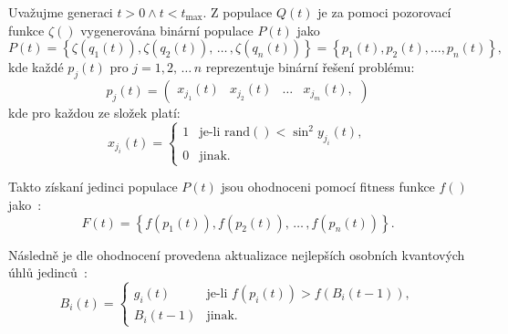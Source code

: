 Uvažujme generaci $t>0 \wedge t<t_{\text{max}}$. Z populace $Q\left(t\right)$ je za pomoci pozorovací funkce $\zeta\left(\right)$ vygenerována binární populace $P\left(t\right)$ jako
\begin{equation}
    P\left(t\right) = \left\{\zeta\left(q_1\left(t\right)\right), \zeta\left(q_2\left(t\right)\right), \,\dots\, , \zeta\left(q_n\left(t\right)\right) \right\} = \left\{ p_1\left(t\right), p_2\left(t\right), \dots, p_n\left(t\right) \right\},
\end{equation}
kde každé $p_j\left(t\right)$ pro $j=1,2,\,\dots\,n$ reprezentuje binární řešení problému:
\begin{equation*}
    p_j\left(t\right) = 
    \begin{pmatrix}
        x_{j_1}\left(t\right) & x_{j_2}\left(t\right) & \dots & x_{j_m}\left(t\right),
    \end{pmatrix}
\end{equation*}
kde pro každou ze složek platí:
\begin{equation*}
    x_{j_i}\left(t\right) =
    \begin{cases}
      1 & \text{je-li } \mathrm{rand}()<\sin^2 y_{j_i}\left(t\right),\\
      0 & \text{jinak.}
    \end{cases}
\end{equation*}

Takto získaní jedinci populace $P\left(t\right)$ jsou ohodnoceni pomocí fitness funkce $f\left(\right)$ jako~\cite{qse}: 
\begin{equation*}
    F\left(t\right) = \left\{ f\left(p_1\left(t\right)\right), f\left(p_2\left(t\right)\right), \,\dots\,, f\left(p_n\left(t\right)\right) \right\}.
\end{equation*}

Následně je dle ohodnocení provedena aktualizace nejlepších osobních kvantových úhlů jedinců~\cite{qse}:
\begin{equation}\label{eq:pers-best}
    B_i\left(t\right) =
    \begin{cases}
        g_i\left(t\right)   & \text{je-li } f\left(p_i\left(t\right)\right) > f\left(B_i\left(t-1\right)\right), \\
        B_i\left(t-1\right) & \text{jinak.}
    \end{cases}
\end{equation}

